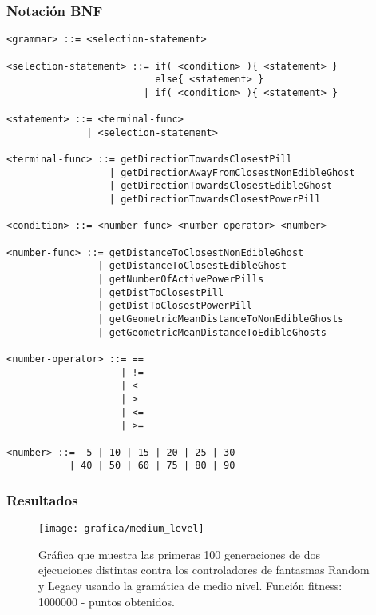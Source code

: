 \subsubsection{Notación BNF}
\begin{lstlisting}[caption={Gramática de medio nivel.}]
<grammar> ::= <selection-statement>

<selection-statement> ::= if( <condition> ){ <statement> }
                          else{ <statement> }
                        | if( <condition> ){ <statement> }

<statement> ::= <terminal-func>
              | <selection-statement>

<terminal-func> ::= getDirectionTowardsClosestPill
                  | getDirectionAwayFromClosestNonEdibleGhost
                  | getDirectionTowardsClosestEdibleGhost
                  | getDirectionTowardsClosestPowerPill
                  
<condition> ::= <number-func> <number-operator> <number>

<number-func> ::= getDistanceToClosestNonEdibleGhost
                | getDistanceToClosestEdibleGhost
                | getNumberOfActivePowerPills
                | getDistToClosestPill
                | getDistToClosestPowerPill
                | getGeometricMeanDistanceToNonEdibleGhosts
                | getGeometricMeanDistanceToEdibleGhosts

<number-operator> ::= ==
                    | !=
                    | <
                    | >
                    | <=
                    | >=

<number> ::=  5 | 10 | 15 | 20 | 25 | 30
           | 40 | 50 | 60 | 75 | 80 | 90
\end{lstlisting}

\subsubsection{Resultados}
\begin{figure}[H]
\centering
\texttt{[image: grafica/medium\_level]}
\caption{Gráfica que muestra las primeras 100 generaciones de dos ejecuciones distintas contra los controladores de fantasmas Random y Legacy usando la gramática de medio nivel. Función fitness: 1000000 - puntos obtenidos.}
\end{figure}

